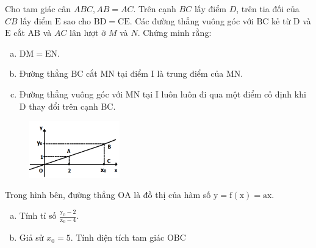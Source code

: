 \begin{bt}
    Cho tam giác cân $A B C, A B=A C$. Trên cạnh $B C$ lấy điểm $D$, trên tia đối của $C B$ lấy điểm $\mathrm{E}$ sao cho $\mathrm{BD}=\mathrm{CE}$. Các đường thẳng vuông góc với $\mathrm{BC}$ kẻ từ $\mathrm{D}$ và $\mathrm{E}$ cắt $\mathrm{AB}$ và $A C$ lân lượt ở $M$ và $N$. Chứng minh rằng: 
    \begin{enumerate}[a.]
    \item $\mathrm{DM}=\mathrm{EN}$.
    \item Đường thẳng $\mathrm{BC}$ cắt $\mathrm{MN}$ tại điểm $\mathrm{I}$ là trung điểm của $\mathrm{MN}$.
    \item Đường thẳng vuông góc với $\mathrm{MN}$ tại I luôn luôn đi qua một điểm cố định khi $\mathrm{D}$ thay đổi trên cạnh BC.
    \end{enumerate}
\loigiai{}
\end{bt}

\begin{bt}
    \begin{figure}
        \centering
        \includegraphics[width=0.35\textwidth]{ds4-b5.png}
    \end{figure}
    Trong hình bên, đường thẳng $\mathrm{OA}$ là đồ thị của hàm số $\mathrm{y}=\mathrm{f}(\mathrm{x})=\mathrm{ax}$.
    \begin{enumerate}[a.]
        \item  Tính tỉ số $\frac{\mathrm{y}_0-2}{\mathrm{x}_0-4}$.
        \item Giả sử $x_0=5$. Tính diện tích tam giác $\mathrm{OBC}$
    \end{enumerate}
    \loigiai{}
\end{bt}